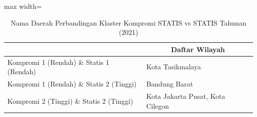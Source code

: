 \begin{table}[H]
\centering
\caption{Nama Daerah Perbandingan Klaster Kompromi STATIS vs STATIS Tahunan (2021)} \label{tab:sample1comp_statis_name_2021}
\begin{adjustbox}{max width=\textwidth}
\begin{tabular}{|>{\centering\arraybackslash}p{4cm}|p{10cm}|}
\hline
\multicolumn{1}{|c|}{\textbf{Kategori}} & \multicolumn{1}{c|}{\textbf{Daftar Wilayah}} \\
\hline
Kompromi 1 (Rendah) \& Statis 1 (Rendah) & Kota Tasikmalaya \\
\hline
Kompromi 1 (Rendah) \& Statis 2 (Tinggi) & Bandung Barat \\
\hline
Kompromi 2 (Tinggi) \& Statis 2 (Tinggi) & Kota Jakarta Pusat, Kota Cilegon \\
\hline
\end{tabular}
\end{adjustbox}
\end{table}